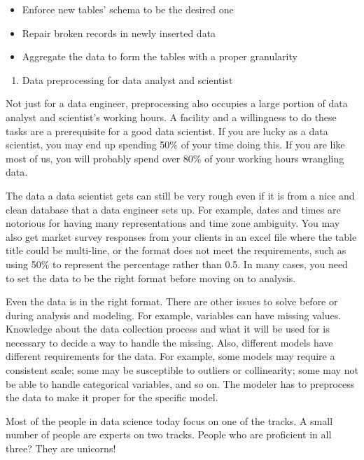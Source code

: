 \documentclass[12pt,]{krantz}
\providecommand{\tightlist}{%
  \setlength{\itemsep}{0pt}\setlength{\parskip}{0pt}}
\begin{document}
\begin{itemize}
\tightlist
\item
  Enforce new tables' schema to be the desired one
\item
  Repair broken records in newly inserted data
\item
  Aggregate the data to form the tables with a proper granularity
\end{itemize}

\begin{enumerate}
\def\labelenumi{(\arabic{enumi})}
\setcounter{enumi}{1}
\tightlist
\item
  Data preprocessing for data analyst and scientist
\end{enumerate}

Not just for a data engineer, preprocessing also occupies a large portion of data analyst and scientist's working hours. A facility and a willingness to do these tasks are a prerequisite for a good data scientist. If you are lucky as a data scientist, you may end up spending 50\% of your time doing this. If you are like most of us, you will probably spend over 80\% of your working hours wrangling data.

The data a data scientist gets can still be very rough even if it is from a nice and clean database that a data engineer sets up. For example, dates and times are notorious for having many representations and time zone ambiguity. You may also get market survey responses from your clients in an excel file where the table title could be multi-line, or the format does not meet the requirements, such as using 50\% to represent the percentage rather than 0.5. In many cases, you need to set the data to be the right format before moving on to analysis.

Even the data is in the right format. There are other issues to solve before or during analysis and modeling. For example, variables can have missing values. Knowledge about the data collection process and what it will be used for is necessary to decide a way to handle the missing. Also, different models have different requirements for the data. For example, some models may require a consistent scale; some may be susceptible to outliers or collinearity; some may not be able to handle categorical variables, and so on. The modeler has to preprocess the data to make it proper for the specific model.

Most of the people in data science today focus on one of the tracks. A small number of people are experts on two tracks. People who are proficient in all three? They are unicorns!
\end{document}
